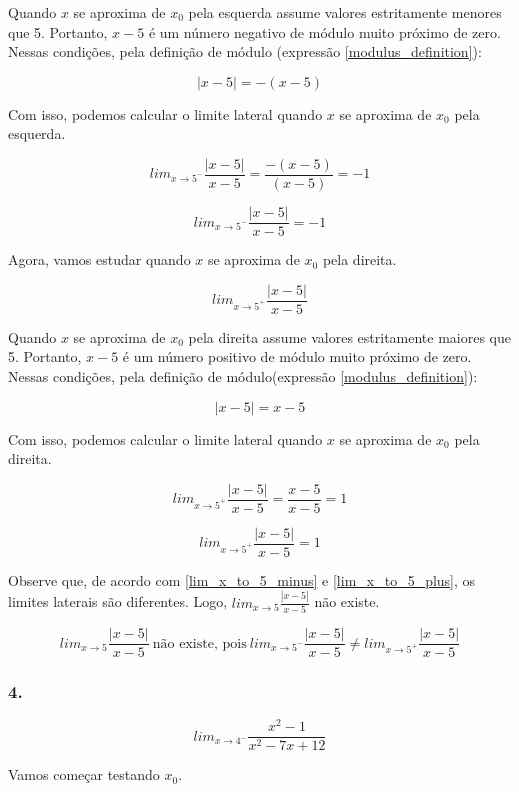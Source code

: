 \documentclass{article}
\begin{document}
Quando \(x\) se aproxima de \(x_0\) pela esquerda assume valores estritamente
menores que 5. Portanto, \(x-5\) é um número negativo de módulo muito próximo de zero.
Nessas condições, pela definição de módulo (expressão \ref{modulus_definition}):

\[
    |x-5| = -(x-5)
\]

Com isso, podemos calcular o limite lateral quando \(x\) se aproxima de \(x_0\) pela esquerda.

\[
    lim_{x\to 5^-} \frac{|x-5|}{x-5} = \frac{-(x-5)}{(x-5)} = -1
\]


\begin{equation} \label{lim_x_to_5_minus}
    lim_{x\to 5^-} \frac{|x-5|}{x-5} = -1
\end{equation}

Agora, vamos estudar quando \(x\) se aproxima de \(x_0\) pela direita.

\[
    lim_{x\to 5^+} \frac{|x-5|}{x-5}
\]

Quando \(x\) se aproxima de \(x_0\) pela direita assume valores estritamente maiores
que 5. Portanto, \(x-5\) é um número positivo de módulo muito próximo de zero.
Nessas condições, pela definição de módulo(expressão \ref{modulus_definition}):

\[
    |x-5| = x-5
\]

Com isso, podemos calcular o limite lateral quando \(x\) se aproxima de \(x_0\) pela direita.

\[
    lim_{x\to 5^+} \frac{|x-5|}{x-5} = \frac{x-5}{x-5} = 1
\]

\begin{equation}  \label{lim_x_to_5_plus}
    lim_{x\to 5^+} \frac{|x-5|}{x-5} = 1
\end{equation}

Observe que, de acordo com \ref{lim_x_to_5_minus} e \ref{lim_x_to_5_plus},
os limites laterais são diferentes. Logo, \(lim_{x\to 5} \frac{|x-5|}{x-5}\) não existe.


\[
    lim_{x\to 5} \frac{|x-5|}{x-5} \
    \mbox{não existe, pois} \ lim_{x\to 5^-} \frac{|x-5|}{x-5}
    \neq
    lim_{x\to 5^+} \frac{|x-5|}{x-5}
\]

\subsubsection*{4.}

\[
    lim_{x\to 4^-} \frac{x^2-1}{x^2-7x+12}
\]

Vamos começar testando \(x_0\).
\end{document}

